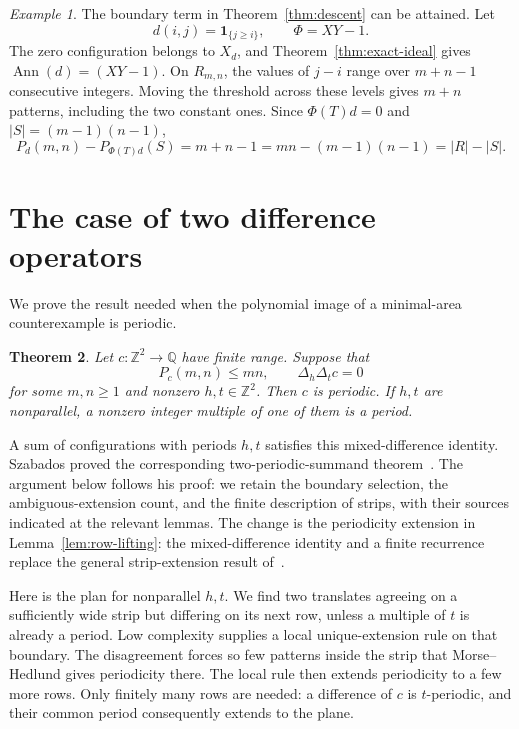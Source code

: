 \documentclass[11pt,a4paper,reqno]{amsart}
\newtheorem{theorem}{Theorem}[section]
\theoremstyle{remark}
\newtheorem{example}[theorem]{Example}
\newcommand{\Z}{\mathbb Z}
\newcommand{\Q}{\mathbb Q}
\newcommand{\De}{\Delta}
\DeclareMathOperator{\Ann}{Ann}
\numberwithin{equation}{section}
\begin{document}
\begin{example}\label{ex:sharp}
The boundary term in Theorem~\ref{thm:descent} can be attained. Let
\[
 d(i,j)=\mathbf1_{\{j\ge i\}},\qquad \Phi=XY-1.
\]
The zero configuration belongs to $X_d$, and Theorem~\ref{thm:exact-ideal} gives $\Ann(d)=(XY-1)$. On $R_{m,n}$, the values of $j-i$ range over $m+n-1$ consecutive integers. Moving the threshold across these levels gives $m+n$ patterns, including the two constant ones. Since $\Phi(T)d=0$ and $|S|=(m-1)(n-1)$,
\[
 P_d(m,n)-P_{\Phi(T)d}(S)=m+n-1
 =mn-(m-1)(n-1)=|R|-|S|.
\]
\end{example}

\section{The case of two difference operators}\label{sec:twofactor}
We prove the result needed when the polynomial image of a minimal-area counterexample is periodic.

\begin{theorem}\label{thm:twofactor}
Let $c:\Z^2\to\Q$ have finite range. Suppose that
\[
 P_c(m,n)\le mn,\qquad \De_h\De_t c=0
\]
for some $m,n\ge1$ and nonzero $h,t\in\Z^2$. Then $c$ is periodic. If $h,t$ are nonparallel, a nonzero integer multiple of one of them is a period.
\end{theorem}

A sum of configurations with periods $h,t$ satisfies this mixed-difference identity. Szabados proved the corresponding two-periodic-summand theorem~\cite[Theorem~1]{Sz}. The argument below follows his proof: we retain the boundary selection, the ambiguous-extension count, and the finite description of strips, with their sources indicated at the relevant lemmas. The change is the periodicity extension in Lemma~\ref{lem:row-lifting}: the mixed-difference identity and a finite recurrence replace the general strip-extension result of~\cite[Lemma~3 and Appendix~A.2]{Sz}.

Here is the plan for nonparallel $h,t$. We find two translates agreeing on a sufficiently wide strip but differing on its next row, unless a multiple of $t$ is already a period. Low complexity supplies a local unique-extension rule on that boundary. The disagreement forces so few patterns inside the strip that Morse--Hedlund gives periodicity there. The local rule then extends periodicity to a few more rows. Only finitely many rows are needed: a difference of $c$ is $t$-periodic, and their common period consequently extends to the plane.
\end{document}
